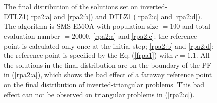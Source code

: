 \documentclass[conference]{IEEEtran}
\begin{document}
\begin{figure}[!t]
  \centering
  \quad
  \\
  \quad
  \\
  \caption{The final distribution of the solutions set on inverted-DTLZ1(\ref{rpa2:a} and \ref{rpa2:b}) 
  and DTLZ1 (\ref{rpa2:c} and \ref{rpa2:d}).
  The algorithm is SMS-EMOA with population size $= 100$ and total evaluation number $= 20000$. 
  \ref{rpa2:a} and \ref{rpa2:c}: the reference point is calculated only once at the initial step;
  \ref{rpa2:b} and \ref{rpa2:d}: the reference point is specified by the Eq. (\ref{frpa1}) with $r=1.1$.
  All the solutions in the final distribution are on the boundary of the PF in (\ref{rpa2:a}),
  which shows the bad effect of a faraway reference point
  on the final distribution of inverted-triangular problems. 
  This bad effect can not be observed on triangular problems in (\ref{rpa2:c}).
  }
  \label{rpa2}
\end{figure}
\end{document}
